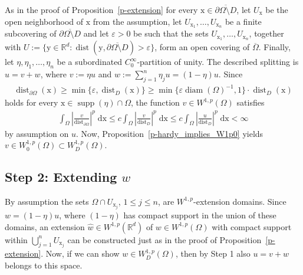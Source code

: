 \documentclass[10pt,leqno]{amsart}
\theoremstyle{definition}
\numberwithin{equation}{section}
\begin{document}
As in the proof of Proposition~\ref{p-extension} for
every ${{\mathrm x}} \in \overline{\partial \Omega \setminus D}$, let $U_{{\mathrm x}}$ be the open
neighborhood of ${{\mathrm x}}$ from the assumption, let $U_{{{\mathrm x}}_1}, \ldots, U_{{{\mathrm x}}_n}$ be a
finite subcovering of $\overline{\partial \Omega \setminus D}$ and let ${\varepsilon} >
0$ be such that the sets $U_{{{\mathrm x}}_1},\ldots,U_{{{\mathrm x}}_n}$, together with $U
:= \{\mathrm y \in {{\mathbb R}}^d : {\operatorname{dist}}(\mathrm y, \overline{\partial \Omega
\setminus D}) > {\varepsilon} \}$, form an open covering of $\overline \Omega$.
Finally, let $\eta, \eta_1, \ldots, \eta_n$ be a subordinated
$C_0^\infty$-partition of unity. The described splitting is $u = v + w$, where
$v:= \eta u$ and $w:= \sum_{j = 1}^n \eta_j u = (1-\eta) u$.
Since
\begin{align*}
 {\operatorname{dist}}_{\partial \Omega}({{\mathrm x}}) \geq \min\{{\varepsilon}, {\operatorname{dist}}_D({{\mathrm x}})\}
\geq \min\{{\varepsilon} {\operatorname{diam}}(\Omega)^{-1},1 \} \cdot {\operatorname{dist}}_D({{\mathrm x}})
\end{align*}
holds for every ${{\mathrm x}} \in {\operatorname{supp}}(\eta) \cap \Omega$, the function $v \in
W^{1,p}(\Omega)$
satisfies
\begin{align*}
 \int_{\Omega} \left| \frac{v}{{\operatorname{dist}}_{\partial \Omega}} \right|^p \; {{\mathrm d}} {{\mathrm x}}
\leq c \int_{\Omega} \left| \frac{v}{{\operatorname{dist}}_D} \right|^p \; {{\mathrm d}} {{\mathrm x}}
\leq c \int_{\Omega} \left| \frac{u}{{\operatorname{dist}}_D} \right|^p \; {{\mathrm d}} {{\mathrm x}} < \infty
\end{align*}
by assumption on $u$. Now, Proposition~\ref{p-hardy_implies_W1p0} yields $v \in
W_0^{1,p}(\Omega) \subset W_D^{1,p}(\Omega)$.

\subsection*{Step 2: Extending $w$}

By assumption the sets $\Omega \cap U_{{{\mathrm x}}_j}$, $1 \leq j \leq n$, are
$W^{1,p}$-extension domains. Since $w =(1-\eta)u$, where $(1-\eta)$ has compact
support in the union of these domains, an extension $\widehat{w} \in
W^{1,p}({{\mathbb R}}^d)$ of $w \in W^{1,p}(\Omega)$ with compact support within
$\bigcup_{j=1}^n U_{{{\mathrm x}}_j}$ can be constructed just as in the proof of
Proposition~\ref{p-extension}. Now, if we can show $w \in W_D^{1,p}(\Omega)$,
then by Step 1 also $u = v + w$ belongs to this space. 
\end{document}
